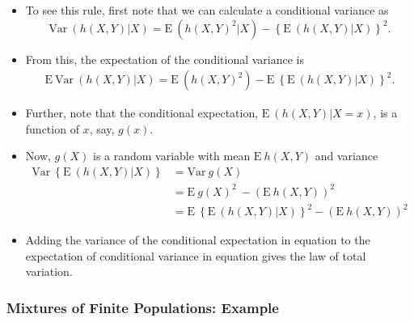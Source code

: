 \documentclass[]{book}
\begin{document}
\begin{itemize}
\item
  To see this rule, first note that we can calculate a conditional
  variance as \[\mathrm{Var~} \left( h(X,Y) | X \right)  =
  \mathrm{E~} \left( h(X,Y)^2 | X \right) -\left\{\mathrm{E~} \left( h(X,Y) | X \right) \right\}^2.\]
\item
  From this, the expectation of the conditional variance is
  \[\begin{aligned}
  \label{E:E1} \mathrm{E~} \mathrm{Var~} \left( h(X,Y) | X \right)  =
  \mathrm{E~} \left( h(X,Y)^2\right) - \mathrm{E~}\left\{\mathrm{E~} \left( h(X,Y) | X \right) \right\}^2.\end{aligned}\]
\item
  Further, note that the conditional expectation,
  \(\mathrm{E~} \left( h(X,Y) | X=x \right)\), is a function of \(x\),
  say, \(g(x)\).
\item
  Now, \(g(X)\) is a random variable with mean \(\mathrm{E~} h(X,Y)\)
  and variance \[\begin{aligned}
  \label{E:E2}
  \mathrm{Var~} \left\{ \mathrm{E~} \left( h(X,Y) | X \right) \right \} &=\mathrm{Var~} g(X)  \nonumber \\
  &= \mathrm{E~} g(X)^2\ - \left(\mathrm{E~} h(X,Y)\right)^2 \nonumber\\
  &= \mathrm{E~} \left\{\mathrm{E~} \left( h(X,Y) | X \right) \right\}^2
  - \left(\mathrm{E~} h(X,Y)\right)^2\end{aligned}\]
\item
  Adding the variance of the conditional expectation in equation to the
  expectation of conditional variance in equation gives the law of total
  variation.
\end{itemize}

\subsubsection{Mixtures of Finite Populations:
Example}\label{mixtures-of-finite-populations-example}
\end{document}
